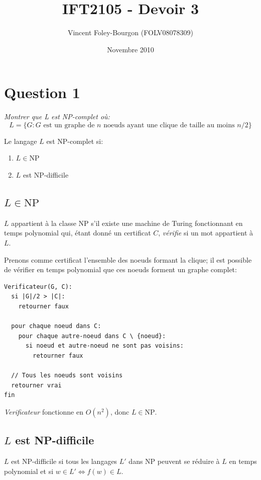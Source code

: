 \documentclass[10pt]{article}
\newcommand{\NP}{\text{NP}}
\begin{document}
\title{IFT2105 - Devoir 3}
\date{Novembre 2010}
\author{Vincent Foley-Bourgon (FOLV08078309)}
\maketitle

\section{Question 1}

\emph{Montrer que L est NP-complet où:}
\[
L = \{ G : G \text{ est un graphe de $n$ noeuds ayant une clique de
  taille au moins $n/2$} \}
\]

Le langage $L$ est NP-complet si:
\begin{enumerate}
  \item $L \in \NP$
  \item $L$ est NP-difficile
\end{enumerate}

\subsection{$L \in \NP$}

$L$ appartient à la classe NP s'il existe une machine de Turing
fonctionnant en temps polynomial qui, étant donné un certificat $C$,
\emph{vérifie} si un mot appartient à $L$.

Prenons comme certificat l'ensemble des noeuds formant la clique; il
est possible de vérifier en temps polynomial que ces noeuds forment un
graphe complet:

\begin{verbatim}
Verificateur(G, C):
  si |G|/2 > |C|:
    retourner faux

  pour chaque noeud dans C:
    pour chaque autre-noeud dans C \ {noeud}:
      si noeud et autre-noeud ne sont pas voisins:
        retourner faux

  // Tous les noeuds sont voisins
  retourner vrai
fin
\end{verbatim}

\emph{Verificateur} fonctionne en $O(n^2)$, donc $L \in \NP$.

\subsection{$L$ est NP-difficile}

$L$ est NP-difficile si tous les langages $L'$ dans NP peuvent se
réduire à $L$ en temps polynomial et si $w \in L' \iff f(w) \in L$.
\end{document}
